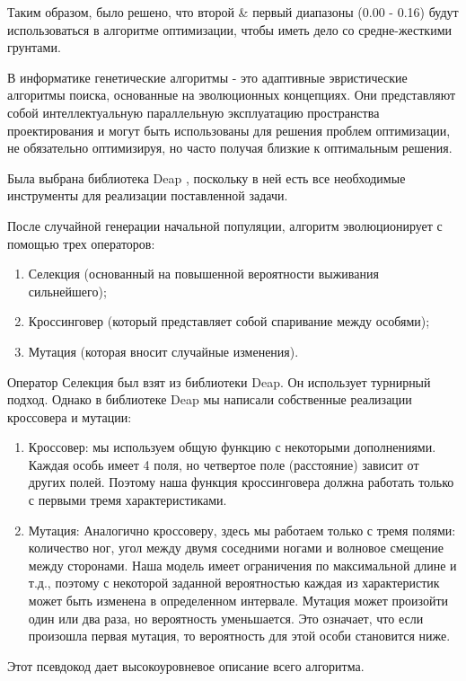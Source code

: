 Таким образом, было решено, что второй \& первый диапазоны (0.00 - 0.16) будут использоваться в алгоритме оптимизации, чтобы иметь дело со средне-жесткими грунтами.

В информатике генетические алгоритмы - это адаптивные эвристические алгоритмы поиска, основанные на эволюционных концепциях. Они представляют собой интеллектуальную параллельную эксплуатацию пространства проектирования и могут быть использованы для решения проблем оптимизации, не обязательно оптимизируя, но часто получая близкие к оптимальным решения. 

Была выбрана библиотека Deap \cite{fortin2012deap}, поскольку в ней есть все необходимые инструменты для реализации поставленной задачи.

После случайной генерации начальной популяции, алгоритм эволюционирует с помощью трех операторов:
\begin{enumerate}
\item Селекция (основанный на повышенной вероятности выживания сильнейшего);
\item Кроссинговер (который представляет собой спаривание между особями);
\item Мутация (которая вносит случайные изменения).
\end{enumerate}

Оператор Селекция был взят из библиотеки Deap. Он использует турнирный подход.
Однако в библиотеке Deap мы написали собственные реализации кроссовера и мутации:
\begin{enumerate}
\item Кроссовер: мы используем общую функцию с некоторыми дополнениями. Каждая особь имеет 4 поля, но четвертое поле (расстояние) зависит от других полей. Поэтому наша функция кроссинговера должна работать только с первыми тремя характеристиками.

\item Мутация: Аналогично кроссоверу, здесь мы работаем только с тремя полями: количество ног, угол между двумя соседними ногами и волновое смещение между сторонами. Наша модель имеет ограничения по максимальной длине и т.д., поэтому с некоторой заданной вероятностью каждая из характеристик может быть изменена в определенном интервале. Мутация может произойти один или два раза, но вероятность уменьшается. Это означает, что если произошла первая мутация, то вероятность для этой особи становится ниже. 
\end{enumerate}

Этот псевдокод дает высокоуровневое описание всего алгоритма.

